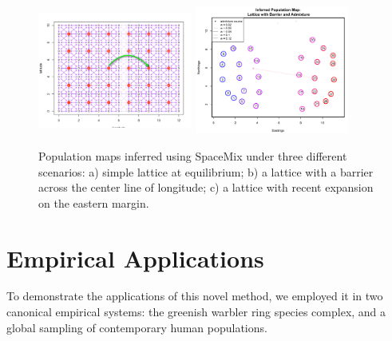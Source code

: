 \documentclass[12pt]{article}
\begin{document}
\begin{figure}[ht!]
	\centering
			{\includegraphics[width=2in,height=1.66in]{figs/bar_inland_ad_scenario.pdf}}
			{\includegraphics[width=2in,height=1.66in]{figs/GeoGenMap_barr_inland_admixture_1.png}}
	\caption{Population maps inferred using SpaceMix under three different scenarios: a) simple lattice at equilibrium; b) a lattice with a barrier across the center line of longitude; c) a lattice with recent expansion on the eastern margin.}\label{sfig:barr_inland_ad}
\end{figure}

\section*{Empirical Applications}
To demonstrate the applications of this novel method, we employed it in two canonical empirical systems: the greenish warbler ring species complex, and a global sampling of contemporary human populations.
\end{document}
